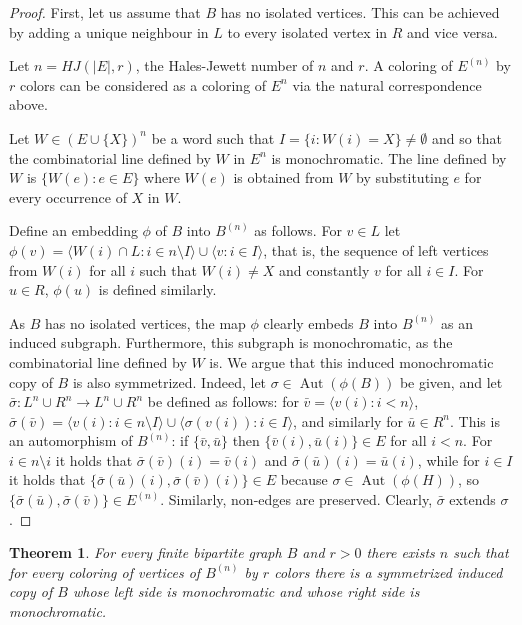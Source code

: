 \documentclass[11pt]{amsart}
\newcommand{\rng}{\rangle}
\newcommand{\lng}{\langle}
\newcommand{\sm}{\setminus}
\newcommand{\aut}{\operatorname{Aut}}
\newtheorem{theorem}{Theorem}[section]
\begin{document}
\begin{proof}
  First, let us assume that $B$ has no isolated vertices. This can be
  achieved by adding a unique neighbour in $L$ to every isolated
  vertex in $R$ and vice versa.


Let $n=HJ(|E|,r)$, the Hales-Jewett number of $n$ and $r$. A coloring
of $E^{(n)}$ by $r$ colors can be considered as a coloring of $E^n$ via
 the natural correspondence above. 

 Let $W\in
(E\cup\{X\})^n$ be a word such that $I=\{i: W(i)=X\}\not=\emptyset$
and so that the combinatorial line defined by $W$ in $E^n$ is
monochromatic. The line defined by $W$ is $\{W(e):e\in E\}$ where
$W(e)$ is obtained from $W$ by substituting $e$ for every occurrence
of $X$ in $W$.

Define an embedding $\phi$  of $B$ into $B^{(n)}$ as follows. For
$v\in L$ let $\phi(v)=\lng W(i)\cap L: i\in n\sm I\rng\cup \lng v:
i\in I\rng$, that is, the sequence of left vertices from $W(i)$ for
all $i$ such that $W(i)\not=X$ and constantly $v$ for all $i\in
I$. For $u\in R$, $\phi(u)$ is defined similarly. 

As $B$ has no isolated vertices, the map $\phi$ clearly embeds $B$
into $B^{(n)}$ as an induced subgraph. Furthermore, this subgraph is
monochromatic, as the combinatorial line defined by $W$ is. We argue
that this induced monochromatic copy of $B$ is also
symmetrized. Indeed, let $\sigma\in \aut (\phi(B))$ be given, and let
$\bar \sigma:L^n\cup R^n\to L^n\cup R^n$ be defined as follows: for
$\bar v= \lng v(i):i<n\rng$, $\bar \sigma(\bar v)=\lng v(i):i\in n\sm
I\rng \cup \lng \sigma(v(i)):i\in I\rng$, and similarly for $\bar u\in
R^n$. This is an automorphism of $B^{(n)}$: if $\{ \bar v,\bar u\}$
then $\{\bar v(i),\bar u(i)\}\in E$ for all $i<n$. For $i\in n\sm i$
it holds that $\bar \sigma (\bar v)(i)=\bar v(i)$ and $\bar
\sigma(\bar u)(i)=\bar u(i)$, while for $i\in I$ it holds that $\{\bar
\sigma(\bar u)(i),\bar\sigma(\bar v)(i)\}\in E$ because $\sigma \in
\aut (\phi(H))$, so $\{\bar\sigma(\bar u),\bar\sigma(\bar v)\}\in
E^{(n)}$. Similarly, non-edges are preserved. Clearly, $\bar \sigma$
extends $\sigma$.
\end{proof} 

\begin{theorem}\label{bip2} 
  For every finite bipartite graph $B$ and $r>0$ there exists $n$ such
  that for every coloring of vertices of $B^{(n)}$ by $r$ colors there
  is a symmetrized induced copy of $B$ whose left side is
  monochromatic and whose right side is monochromatic.
\end{theorem}
\end{document}
